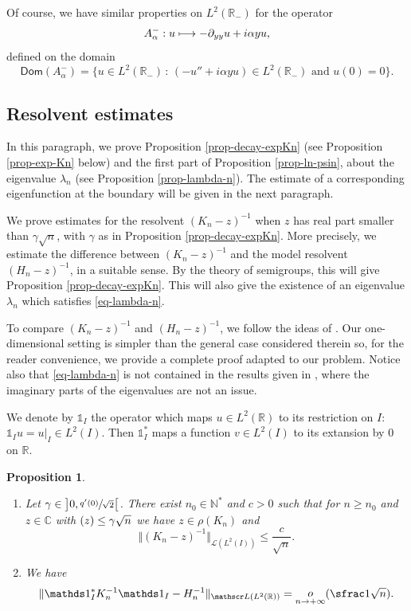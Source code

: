 \documentclass[10pt]{amsart}
\let\mathcal\mathscr
\def\mto{\mathchoice{\longmapsto}{\mapsto}{\mapsto}{\mapsto}}
\theoremstyle{plain}
\newtheorem{proposition}[theorem]{Proposition}
\theoremstyle{definition}
\newcommand{\nr}[1]{\Vert #1\Vert}
\newcommand{\bset}[1]{\bigl\{ #1\bigr\}}
\newcommand{\inv}{^{-1}}
\newcommand{\littleo}[2]{\mathop{o}\limits_{#1 \to #2}}
\newcommand{\1}{\mathds 1}
\newcommand{\st}{\,:\,}
\let\Re\relax
\DeclareMathOperator{\Re}{\mathsf{Re}\mkern2mu}
\newcommand{\Dom}{\mathsf{Dom}}
\newcommand{\R}{\mathbb{R}}
\def\C{\mathbb{C}}
\newcommand{\N}{\mathbb{N}}
\let\a\alpha
\let\l\lambda
\newcommand{\Lc}{{\mathcal L}}
\begin{document}
Of course, we have similar properties on $L^2(\R_-)$ for the operator
\[
A_\a^- : u \mto -\partial_{yy} u + i \a y u,
\]
defined on the domain
\[
\Dom(A_\a^-) = \bset{u \in L^2(\R_-) \st (-u'' + i \a y u) \in L^2(\R_-) \text{ and } u(0) = 0}.
\]

\subsection{Resolvent estimates}\label{sec-Henry}

In this paragraph, we prove Proposition \ref{prop-decay-expKn} (see Proposition \ref{prop-exp-Kn} below) and the first part of Proposition \ref{prop-ln-psin}, about the eigenvalue $\l_n$ (see Proposition \ref{prop-lambda-n}). The estimate of a corresponding eigenfunction at the boundary will be given in the next paragraph.

We prove estimates for the resolvent $(K_n-z)\inv$ when $z$ has real part smaller than $\gamma \sqrt n$, with $\gamma$ as in Proposition \ref{prop-decay-expKn}. More precisely, we estimate the difference between $(K_n-z)\inv$ and the model resolvent $(H_n-z)\inv$, in a suitable sense. By the theory of semigroups, this will give Proposition \ref{prop-decay-expKn}. This will also give the existence of an eigenvalue $\l_n$ which satisfies \eqref{eq-lambda-n}.

To compare $(K_n-z)\inv$ and $(H_n-z)\inv$, we follow the ideas of \cite{henry}. Our one-dimensional setting is simpler than the general case considered therein so, for the reader convenience, we provide a complete proof adapted to our problem. Notice also that \eqref{eq-lambda-n} is not contained in the results given in \cite{henry}, where the imaginary parts of the eigenvalues are not an issue.

We denote by $\1_I$ the operator which maps $u \in L^2(\R)$ to its restriction on $I$: $\1_I u = u|_{I} \in L^2(I)$. Then $\1_I^*$ maps a function $v \in L^2(I)$ to its extansion by 0 on $\R$.

\skpt
\begin{proposition}
\begin{enumerate}
\item Let $\gamma \in \big]0,\sfrac {q'(0)}{\sqrt 2}\big[$. There exist $n_0 \in \N^*$ and $c > 0$ such that for $n \geq n_0$ and $z \in \C$ with $\Re(z) \leq \gamma \sqrt n$ we have $z \in \rho(K_n)$ and
\[
\nr{(K_n-z)\inv}_{\Lc(L^2(I))} \leq \frac {c}{\sqrt n}.
\]
\item We have
\[
\nr{\1_I^* K_n\inv \1_I - H_n\inv }_{\Lc(L^2(\R))} = \littleo n {+\infty}(\sfrac 1 {\sqrt n}).
\]
\end{enumerate}
\label{prop-spectre-Kn}
\end{proposition}
\end{document}
